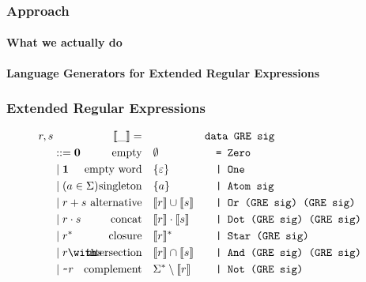 \documentclass[pdftex,aspectratio=169]{beamer}
\begin{document}
\begin{frame}
  \frametitle{Approach}
  \framesubtitle{What we actually do}
  \begin{Huge}
    \begin{center}
      \bf
      Language Generators for Extended Regular Expressions
    \end{center}
  \end{Huge}
\end{frame}
\begin{frame}
  \frametitle{Extended Regular Expressions}
  \vspace{-\baselineskip}
  \footnotesize
  \begin{align*}
    r, s & &\Lang{\_}=\quad &  &
                             \makebox[1em][l]{\code{data GRE sig}}\\
         & ::= \Rnull & \ltext{empty}
                        & \emptyset
                           &&\code{= Zero}\\
         & \mid \Rempty & \ltext{empty word}
                        & \{ \varepsilon \}
                           && \code{| One}\\
         & \mid (a \in \Sigma) & \ltext{singleton}
                        &  \{ a \}
                           && \code{| Atom sig} \\
         & \mid \Runion rs & \ltext{alternative}
                        &  \Lang{r} \cup \Lang{s}
                           && \code{| Or (GRE sig) (GRE sig)}\\
         & \mid \Rconcat rs & \ltext{concat}
                        &  \Lang r \cdot \Lang s
                           && \code{| Dot (GRE sig) (GRE sig)}\\
         & \mid \Rstar r & \ltext{closure}
                        & \Lang r^* 
                           && \code{| Star (GRE sig)}\\
         & \mid \Rintersect rs & \ltext{intersection}
                        & \Lang r \cap \Lang s
                           && \code{| And (GRE sig) (GRE sig)}\\
         & \mid \Rcomplement r & \ltext{complement}
                        & \Sigma^* \setminus \Lang r
                           && \code{| Not (GRE sig)}
  \end{align*}
\end{frame} 
\end{document}
